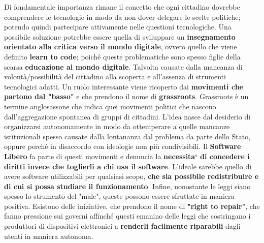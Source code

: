 Di fondamentale importanza rimane il concetto che ogni cittadino dovrebbe comprendere le tecnologie in modo da non dover delegare le scelte politiche; potendo quindi partecipare attivamente nelle questioni tecnologiche.
\bigbreak
Una possibile soluzione potrebbe essere quella di sviluppare un \textbf{insegnamento orientato alla critica verso il mondo digitale}, ovvero quello che viene definito \textbf{learn to code}; poiché queste problematiche sono spesso figlie della scarsa \textbf{educazione al mondo digitale}. Talvolta causate dalla mancanza di volontà/possibilità del cittadino alla scoperta e all'assenza di strumenti tecnologici adatti.
\bigbreak
Un ruolo interessante viene ricoperto dai \textbf{movimenti che partono dal "basso"} e che prendono il nome di \textbf{grassroots}. Grassroots è un termine anglosassone che indica quei movimenti politici che nascono dall'aggregazione spontanea di gruppi di cittadini. L'idea nasce dal desiderio di organizzarsi autonomamente in modo da ottemperare a quelle mancanze istituzionali spesso causate dalla lontananza dal problema da parte dello Stato, oppure perché in disaccordo con ideologie non più condivisibili.
Il \textbf{Software Libero} fa parte di questi movimenti e denuncia la \textbf{necessita` di concedere i diritti invece che toglierli a chi usa il software}. L'ideale sarebbe quello di avere software utilizzabili per qualsiasi scopo, \textbf{che sia possibile redistribuire e di cui si possa studiare il funzionamento}.
\bigbreak
Infine, nonostante le leggi siano spesso lo strumento del "male", queste possono essere sfruttate in maniera positiva. Esistono delle iniziative, che prendono il nome di \textbf{"right to repair"}, che fanno pressione sui governi affinché questi emanino delle leggi che costringano i produttori di dispositivi elettronici a \textbf{renderli facilmente riparabili} dagli utenti in maniera autonoma.


